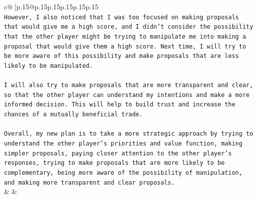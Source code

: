 \documentclass{article}
\begin{document}
{\begin{supertabular}{c@{$\;$}|p{.15\linewidth}@{}p{.15\linewidth}p{.15\linewidth}p{.15\linewidth}p{.15\linewidth}p{.15\linewidth}}
{{{\\ 
\texttt{However, I also noticed that I was too focused on making proposals that would give me a high score, and I didn't consider the possibility that the other player might be trying to manipulate me into making a proposal that would give them a high score. Next time, I will try to be more aware of this possibility and make proposals that are less likely to be manipulated.} \\
\\ 
\texttt{I will also try to make proposals that are more transparent and clear, so that the other player can understand my intentions and make a more informed decision. This will help to build trust and increase the chances of a mutually beneficial trade.} \\
\\ 
\texttt{Overall, my new plan is to take a more strategic approach by trying to understand the other player's priorities and value function, making simpler proposals, paying closer attention to the other player's responses, trying to make proposals that are more likely to be complementary, being more aware of the possibility of manipulation, and making more transparent and clear proposals.} \\
            }
        }
    }
    & & \\ \\


\end{supertabular}}
\end{document}
